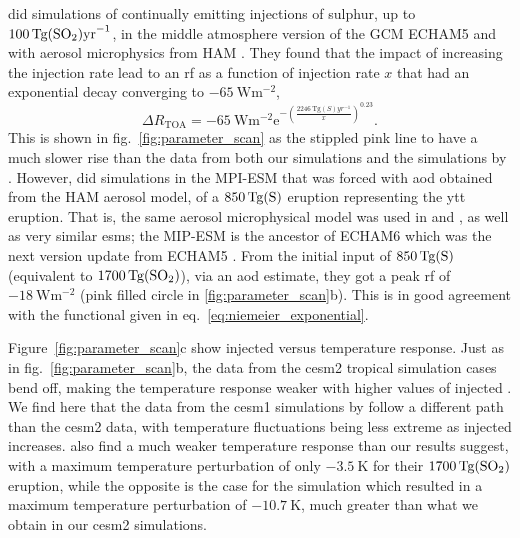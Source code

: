 \documentclass{ametsocV6.1}
\newcommand{\iso}[1][i]{{#1}njected \ce{SO2}}
\begin{document}
\citet{niemeier2015} did simulations of continually emitting injections of sulphur, up
to \(\SI{100}{\tera\gram(\ce{SO2})\mathrm{yr}^{-1}}\), in the middle atmosphere version
of the GCM ECHAM5 \citep{giorgetta2006} and with aerosol microphysics from HAM
\citep{stier2005}. They found that the impact of increasing the injection rate lead to
an \gls{rf} as a function of injection rate \(x\) that had an exponential decay
converging to \(\SI{-65}{\watt\meter^{-2}}\),
\begin{equation}
  \Delta
  R_{\mathrm{TOA}} =
  -\SI{65}{\watt\metre^{-2}}
  \mathrm{e}^{-{\left(\frac{\SI{2246}{\tera\gram(S)yr^{-1}}}{x}\right)}^{0.23}}.
  \label{eq:niemeier_exponential}
\end{equation}
This is shown in fig.~\ref{fig:parameter_scan} as the stippled pink line to have a much
slower rise than the data from both our simulations and the simulations by
\citet{ottobliesner2016}. However, \citet{timmreck2010} did simulations in the MPI-ESM
that was forced with \gls{aod} obtained from the HAM aerosol model, of a
\(\SI{850}{\tera\gram(\ce{S})}\) eruption representing the \gls{ytt} eruption. That is,
the same aerosol microphysical model was used in \citet{timmreck2010} and
\citet{niemeier2015}, as well as very similar \glspl{esm}; the MIP-ESM is the ancestor
of ECHAM6 which was the next version update from ECHAM5 \citep{kuma2023}. From the
initial input of \(\SI{850}{\tera\gram(\ce{S})}\) (equivalent to
\(\SI{1700}{\tera\gram(\ce{SO2})}\)), via an \gls{aod} estimate, they got a peak
\gls{rf} of \(\SI{-18}{\watt\metre^{-2}}\) (pink filled circle in
\ref{fig:parameter_scan}b). This is in good agreement with the functional given in
eq.~\ref{eq:niemeier_exponential}.

Figure~\ref{fig:parameter_scan}c show \iso{} versus temperature response. Just as in
fig.~\ref{fig:parameter_scan}b, the data from the \gls{cesm2} tropical simulation cases
bend off, making the temperature response weaker with higher values of \iso{}. We find
here that the data from the \gls{cesm1} simulations by \citet{ottobliesner2016} follow a
different path than the \gls{cesm2} data, with temperature fluctuations being less
extreme as \iso{} increases. \citet{timmreck2010} also find a much weaker temperature
response than our results suggest, with a maximum temperature perturbation of only
\(\SI{-3.5}{\kelvin}\) for their \(\SI{1700}{\tera\gram(\ce{SO2})}\) eruption, while the
opposite is the case for the \citet{jones2005} simulation which resulted in a maximum
temperature perturbation of \(\SI{-10.7}{\kelvin}\), much greater than what we obtain in
our \gls{cesm2} simulations.
\end{document}
